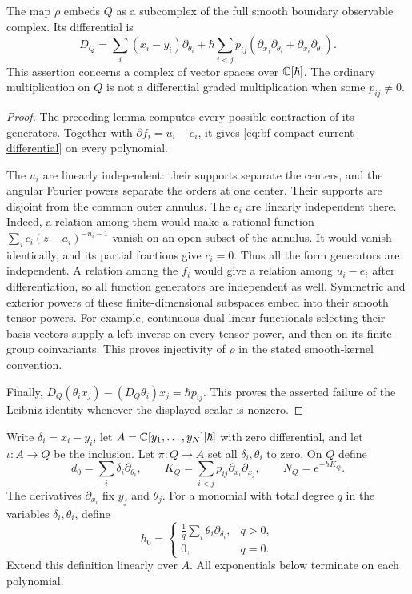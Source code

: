 \begin{proposition}
\label{prop:bf-compact-current-complex}
The map $\rho$ embeds $Q$ as a subcomplex of the full smooth boundary
observable complex.  Its differential is
\begin{equation}
 \label{eq:bf-compact-current-differential}
 D_Q=\sum_i(x_i-y_i)\partial_{\theta_i}
   +\hbar\sum_{i<j}p_{ij}
       (\partial_{x_j}\partial_{\theta_i}
        +\partial_{x_i}\partial_{\theta_j}).
\end{equation}
This assertion concerns a complex of vector spaces over
$\mathbb C[\hbar]$.  The ordinary multiplication on $Q$ is not a
differential graded multiplication when some $p_{ij}\ne0$.
\end{proposition}
\begin{proof}
The preceding lemma computes every possible contraction of its
generators.  Together with $\bar\partial f_i=u_i-e_i$, it gives
\eqref{eq:bf-compact-current-differential} on every polynomial.

The $u_i$ are linearly independent: their supports separate the
centers, and the angular Fourier powers separate the orders at one
center.  Their supports are disjoint from the common outer annulus.
The $e_i$ are linearly independent there.  Indeed, a relation among
them would make a rational function
$\sum_i c_i(z-a_i)^{-n_i-1}$ vanish on an open subset of the annulus.
It would vanish identically, and its partial fractions give $c_i=0$.
Thus all the form generators are independent.  A relation among
the $f_i$ would give a relation among $u_i-e_i$ after differentiation,
so all function generators are independent as well.
Symmetric and exterior powers of these finite-dimensional subspaces
embed into their smooth tensor powers.  For example, continuous dual
linear functionals selecting their basis vectors supply a left inverse
on every tensor power, and then on its finite-group coinvariants.
This proves injectivity of $\rho$ in the stated smooth-kernel convention.

Finally,
$D_Q(\theta_i x_j)-(D_Q\theta_i)x_j=\hbar p_{ij}$.
This proves the asserted failure of the Leibniz identity whenever
the displayed scalar is nonzero.
\end{proof}

Write $\delta_i=x_i-y_i$, let
$A=\mathbb C[y_1,\ldots,y_N][\hbar]$ with zero differential, and let
$\iota:A\to Q$ be the inclusion.  Let $\pi:Q\to A$ set all
$\delta_i,\theta_i$ to zero.  On $Q$ define
\[
 d_0=\sum_i\delta_i\partial_{\theta_i},\qquad
 K_Q=\sum_{i<j}p_{ij}\partial_{x_i}\partial_{x_j},\qquad
 N_Q=e^{-\hbar K_Q}.
\]
The derivatives $\partial_{x_i}$ fix $y_j$ and $\theta_j$.
For a monomial with total degree $q$ in the variables
$\delta_i,\theta_i$, define
\[
 h_0=\begin{cases}
 \displaystyle\frac1q\sum_i\theta_i\partial_{\delta_i},&q>0,\\[4pt]
 0,&q=0.
 \end{cases}
\]
Extend this definition linearly over $A$.
All exponentials below terminate on each polynomial.

